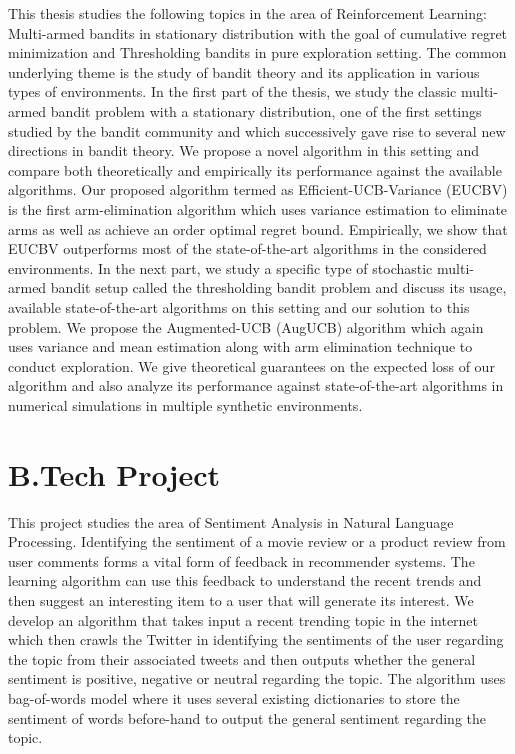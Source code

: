 \documentclass[margin,11pt]{res}
\begin{document}
\begin{resume}
This thesis studies the following topics in the area of Reinforcement Learning: Multi-armed bandits in stationary distribution with the goal of cumulative regret minimization and Thresholding bandits in pure exploration setting. The common underlying theme is the study of bandit theory and its application in various types of environments. In the first part of the thesis, we study the classic multi-armed bandit problem with a stationary distribution, one of the first settings studied by the bandit community and which successively gave rise to several new directions in bandit theory. We propose a novel algorithm in this setting and compare both theoretically and empirically its performance against the available algorithms. Our proposed algorithm termed as Efficient-UCB-Variance (EUCBV) is the first arm-elimination algorithm which uses variance estimation to eliminate arms as well as achieve an order optimal regret bound. Empirically, we show that EUCBV outperforms most of the state-of-the-art algorithms in the considered environments. In the next part, we study a specific type of stochastic multi-armed bandit setup called the thresholding bandit problem and discuss its usage, available state-of-the-art algorithms on this setting and our solution to this problem. We propose the Augmented-UCB (AugUCB) algorithm which again uses variance and mean estimation along with arm elimination technique to conduct exploration. We give theoretical guarantees on the expected loss of our algorithm and also analyze its performance against state-of-the-art algorithms in numerical simulations in multiple synthetic environments. 


\section{B.Tech Project}

This project studies the area of Sentiment Analysis in Natural Language Processing. Identifying the sentiment of a movie review or a product review from user comments forms a vital form of feedback in recommender systems. The learning algorithm can use this feedback to understand the recent trends and then suggest an interesting item to a user that will generate its interest. We develop an algorithm that takes input a recent trending topic in the internet which then crawls the Twitter in identifying the sentiments of the user regarding the topic from their associated tweets and then outputs whether the general sentiment is positive, negative or neutral regarding the topic. The algorithm uses bag-of-words model where it uses several existing dictionaries to store the sentiment of words before-hand to output the general sentiment regarding the topic.




\end{resume}
\end{document}
